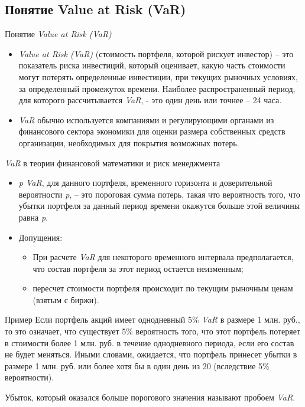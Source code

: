 \documentclass[financial_risks_lectures.tex]{subfiles}
\begin{document}
\subsection{Понятие Value at Risk (VaR)}
\begin{frame}{Понятие \textit{Value at Risk (VaR)}}
\begin{itemize}[<+->]
\item
\textit{Value at Risk (VaR)}  (стоимость портфеля, которой рискует инвестор) – это показатель риска инвестиций, который оценивает, какую часть стоимости могут потерять определенные инвестиции, при текущих рыночных условиях, за определенный промежуток времени. Наиболее распространенный период, для которого рассчитывается \textit{VaR}, - это один день или точнее – 24 часа. 
\item
\textit{VaR} обычно используется компаниями и регулирующими органами из финансового сектора экономики для оценки размера собственных средств организации, необходимых для покрытия возможных потерь.

\end{itemize}
\end{frame}

\begin{frame}{\textit{VaR }в теории финансовой математики и риск менеджмента}
\begin{itemize}[<+->]
\item
\textit{p VaR}, для данного портфеля, временного горизонта и доверительной вероятности \textit{p},  – это пороговая сумма потерь, такая что вероятность того, что убытки портфеля за данный период времени окажутся больше этой величины равна \textit{p}. 
\item
Допущения:
\begin{itemize}[<+->]
\item
При расчете \textit{VaR} для некоторого  временного интервала предполагается, что состав портфеля за этот период остается неизменным;
\item
пересчет стоимости портфеля происходит по текущим рыночным ценам (взятым с биржи).
\end{itemize}
\end{itemize}
\end{frame}

\begin{frame}
\begin{exampleblock}{Пример}
Если портфель акций имеет однодневный 5\% \textit{VaR }в размере 1 млн. руб., то это означает, что существует 5\% вероятность того, что этот портфель потеряет в стоимости более 1 млн. руб. в течение однодневного периода, если его состав не будет меняться. Иными словами, ожидается, что портфель принесет убытки в размере 1 млн. руб. или более хотя бы в один день из 20 (вследствие 5\% вероятности). \end{exampleblock}

Убыток, который оказался больше порогового значения называют пробоем \textit{VaR}.

\end{frame}
\end{document}
